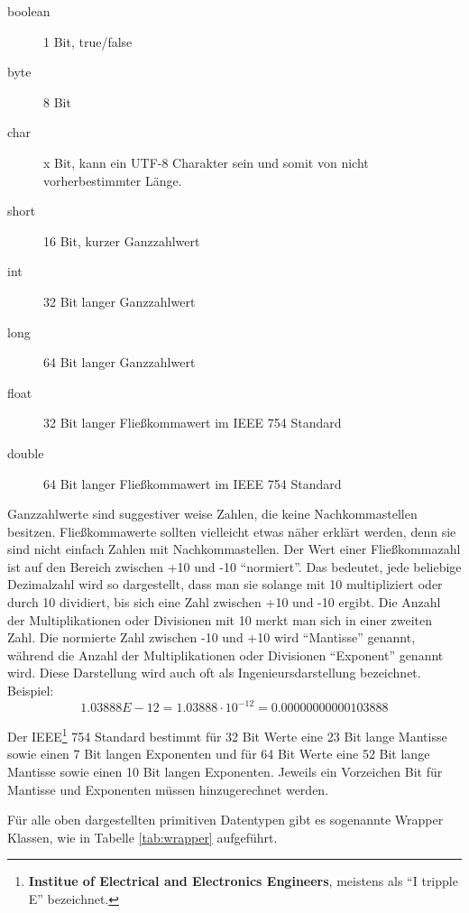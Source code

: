 \begin{description}
\item[boolean] 1 Bit, true/false
\item[byte] 8 Bit
\item[char] x Bit, kann ein UTF-8 Charakter sein und somit von nicht vorherbestimmter Länge.
\item[short] 16 Bit, kurzer Ganzzahlwert
\item[int] 32 Bit langer Ganzzahlwert
\item[long] 64 Bit langer Ganzzahlwert
\item[float] 32 Bit langer Fließkommawert im IEEE 754 Standard
\item[double] 64 Bit langer Fließkommawert im IEEE 754 Standard
\end{description}

Ganzzahlwerte sind suggestiver weise Zahlen, die keine Nachkommastellen besitzen. Fließkommawerte sollten vielleicht etwas näher erklärt werden, denn sie sind nicht einfach Zahlen mit Nachkommastellen. Der Wert einer Fließkommazahl ist auf den Bereich zwischen +10 und -10 "`normiert"'. Das bedeutet, jede beliebige Dezimalzahl wird so dargestellt, dass man sie solange mit 10 multipliziert oder durch 10 dividiert, bis sich eine Zahl zwischen +10 und -10 ergibt. Die Anzahl der Multiplikationen oder Divisionen mit 10 merkt man sich in einer zweiten Zahl. Die normierte Zahl zwischen -10 und +10 wird "`Mantisse"' genannt, während die Anzahl der Multiplikationen oder Divisionen "`Exponent"' genannt wird. Diese Darstellung wird auch oft als Ingenieursdarstellung bezeichnet. Beispiel:
\begin{equation*}
1.03888E-12 = 1.03888\cdot 10^{-12} = 0.00000000000103888
\end{equation*}

Der IEEE\footnote{\textbf{Institue of Electrical and Electronics Engineers}, meistens als "`I tripple E"' bezeichnet.} 754 Standard bestimmt für 32 Bit Werte eine 23 Bit lange Mantisse sowie einen 7 Bit langen Exponenten und für 64 Bit Werte eine 52 Bit lange Mantisse sowie einen 10 Bit langen Exponenten. Jeweils ein Vorzeichen Bit für Mantisse und Exponenten müssen hinzugerechnet werden.

Für alle oben dargestellten primitiven Datentypen gibt es sogenannte Wrapper Klassen, wie in Tabelle \ref{tab:wrapper} aufgeführt.

